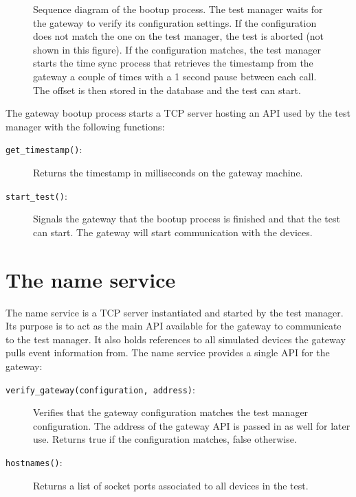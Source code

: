 \begin{figure}[h!]

    \caption[Sequence diagram of the bootup process.]{Sequence diagram of the
    bootup process. The test manager waits for the gateway to verify its
    configuration settings. If the configuration does not match the one on the
    test manager, the test is aborted (not shown in this figure). If the
    configuration matches, the test manager starts the time sync process that
    retrieves the timestamp from the gateway a couple of times with a 1 second
    pause between each call. The offset is then stored in the database and the
    test can start.}

    \label{fig:bootup_process}
\end{figure}

The gateway bootup process starts a TCP server hosting an API used by the test
manager with the following functions:

\begin{description}

    \item[\texttt{get\_timestamp()}:] Returns the timestamp in milliseconds on
        the gateway machine.

    \item[\texttt{start\_test()}:] Signals the gateway that the bootup process
        is finished and that the test can start. The gateway will start
        communication with the devices.

\end{description}

\section{The name service}

The name service is a TCP server instantiated and started by the test manager.
Its purpose is to act as the main API available for the gateway to communicate
to the test manager. It also holds references to all simulated devices the
gateway pulls event information from. The name service provides a single API for
the gateway:

\begin{description}

    \item[\texttt{verify\_gateway(configuration, address)}:] Verifies that the
        gateway configuration matches the test manager configuration. The
        address of the gateway API is passed in as well for later use. Returns
        true if the configuration matches, false otherwise.

    \item[\texttt{hostnames()}:] Returns a list of socket ports associated to
        all devices in the test.

\end{description}

